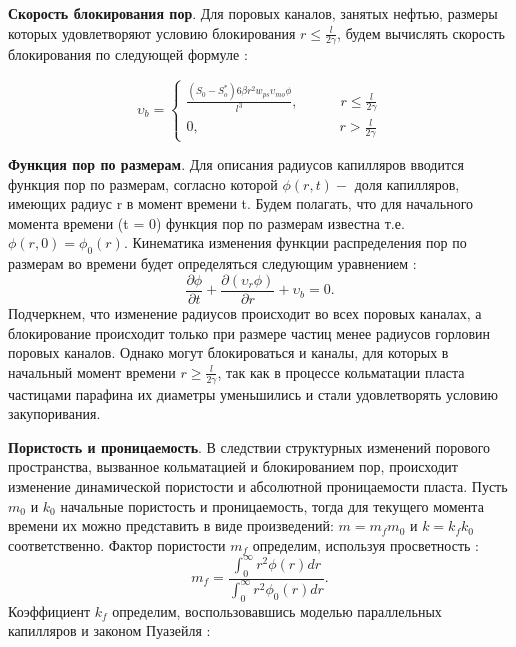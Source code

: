 \documentclass[a4paper,12pt]{article}
\begin{document}
\par \textbf{Скорость блокирования пор}. Для поровых каналов, занятых нефтью, размеры которых удовлетворяют условию блокирования $r \leq \frac{l}{2 \gamma}$, будем вычислять скорость блокирования по следующей формуле \cite{bib:04}:
	
\begin{equation}\label{eq8}
\upsilon_b = \left\{\begin{matrix}
\frac{(S_0-S_{o}^{*}) 6 \beta r^2 w_{ps} \upsilon_{mo} \phi}{l^3}, \quad \qquad r \leq \frac{l}{2 \gamma}
 \\
 0, \qquad \qquad \qquad \qquad \qquad r > \frac{l}{2 \gamma}
\end{matrix}\right.
\end{equation}

\par \textbf{Функция пор по размерам}. Для описания радиусов капилляров вводится функция пор по размерам, согласно которой $ \phi (r,t)-$ доля капилляров, имеющих радиус r в момент времени t. Будем полагать, что для начального момента времени (t = 0) функция пор по размерам известна т.е. $ \phi (r,0)= \phi_0 (r)$.
Кинематика изменения функции распределения пор по размерам во времени будет определяться следующим уравнением \cite{bib:05}:
\begin{equation}\label{eq9}
\frac{\partial \phi}{\partial t} + \frac{\partial (\upsilon_r \phi)}{\partial r} + \upsilon_b = 0.
\end{equation}
Подчеркнем, что изменение радиусов происходит во всех поровых каналах, а блокирование происходит только при размере частиц менее радиусов горловин поровых каналов. Однако могут блокироваться и каналы, для которых в начальный момент времени $r \geq \frac{l}{2 \gamma}$, так как в процессе кольматации пласта частицами парафина их диаметры уменьшились и стали удовлетворять условию закупоривания.

\par \textbf{Пористость и проницаемость}. В следствии структурных изменений порового пространства, вызванное кольматацией и блокированием пор, происходит изменение динамической пористости и абсолютной проницаемости пласта. Пусть $m_0$ и $k_0$ начальные пористость и проницаемость, тогда для текущего момента времени их можно представить в виде произведений: $m=m_f m_0$ и $k=k_f k_0$ соответственно. Фактор пористости $m_f$ определим, используя просветность \cite{bib:04}: 
\begin{equation}\label{eq10}
m_f = \frac
{ \int_{0}^{\infty} r^2 \phi (r) dr}
{ \int_{0}^{\infty} r^2 \phi_0 (r) dr}.
\end{equation}
Коэффициент $k_f$ определим, воспользовавшись моделью параллельных капилляров и законом Пуазейля \cite{bib:04}:
\end{document}

